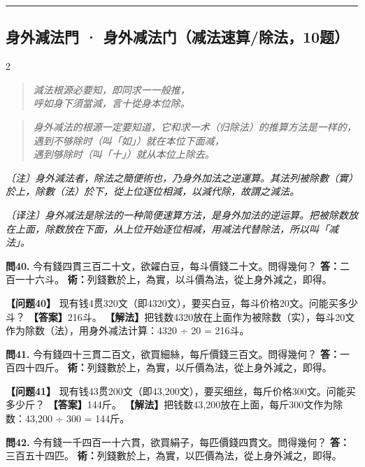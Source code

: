 \documentclass[11pt,a4paper]{article}
\newcommand{\longline}{\noindent\rule{\textwidth}{0.4pt}}
\newcommand{\rhymeCL}[1]{%
  \begin{quote}\itshape\color{verselinecolor}#1\end{quote}
}
\newcommand{\rhymeMOD}[1]{%
  \begin{quote}\itshape\color{verselinecolor}#1\end{quote}
}
\newcommand{\noteCL}[1]{\par\textcolor{notecolor}{\small\textit{〔注〕#1}}\par\smallskip}
\newcommand{\noteMOD}[1]{\par\textcolor{notecolor}{\small\textit{〔译注〕#1}}\par\smallskip}
\begin{document}
\longline

\subsection{身外減法門 · 身外减法门（减法速算/除法，10题）}
\label{sec:shenwaijian}

\begin{paracol}{2}
\rhymeCL{減法根源必要知，即同求一一般推，\\
呼如身下須當減，言十從身本位除。}
\switchcolumn
\rhymeMOD{身外减法的根源一定要知道，它和求一术（归除法）的推算方法是一样的，\\
遇到不够除时（叫「如」）就在本位下面减，\\
遇到够除时（叫「十」）就从本位上除去。}
\switchcolumn*
\noteCL{身外減法者，除法之簡便術也，乃身外加法之逆運算。其法列被除數（實）於上，除數（法）於下，從上位逐位相減，以減代除，故謂之減法。}
\switchcolumn
\noteMOD{身外减法是除法的一种简便速算方法，是身外加法的逆运算。把被除数放在上面，除数放在下面，从上位开始逐位相减，用减法代替除法，所以叫「减法」。}

\switchcolumn*

\textbf{問40.} 今有錢四貫三百二十文，欲糴白豆，每斗價錢二十文。問得幾何？\break
\textbf{答：}二百一十六斗。\break
\textbf{術：}列錢數於上，為實，以斗價為法，從上身外減之，即得。

\switchcolumn

\textbf{【问题40】} 现有钱4贯320文（即4320文），要买白豆，每斗价格20文。问能买多少斗？\break
\textbf{【答案】}216斗。\break
\textbf{【解法】}把钱数4320放在上面作为被除数（实），每斗20文作为除数（法），用身外减法计算：4320 ÷ 20 = 216斗。

\switchcolumn*

\textbf{問41.} 今有錢四十三貫二百文，欲買細絲，每斤價錢三百文。問得幾何？\break
\textbf{答：}一百四十四斤。\break
\textbf{術：}列錢數於上，為實，以斤價為法，從上身外減之，即得。

\switchcolumn

\textbf{【问题41】} 现有钱43贯200文（即43,200文），要买细丝，每斤价格300文。问能买多少斤？\break
\textbf{【答案】}144斤。\break
\textbf{【解法】}把钱数43,200放在上面，每斤300文作为除数：43,200 ÷ 300 = 144斤。

\switchcolumn*

\textbf{問42.} 今有錢一千四百一十六貫，欲買絹子，每匹價錢四貫文。問得幾何？\break
\textbf{答：}三百五十四匹。\break
\textbf{術：}列錢數於上，為實，以匹價為法，從上身外減之，即得。


\end{paracol}
\end{document}
